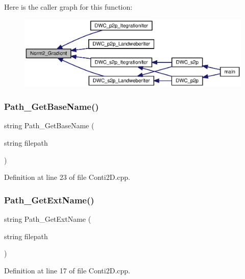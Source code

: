 Here is the caller graph for this function\+:\nopagebreak
\begin{figure}[H]
\begin{center}
\leavevmode
\includegraphics[width=350pt]{Conti2D_8cpp_a43fc3af75243a047d61aadea31c0fa9c_a43fc3af75243a047d61aadea31c0fa9c_icgraph}
\end{center}
\end{figure}
\mbox{\label{Conti2D_8cpp_a3c05f14aad4d9edc8c97ce180341a758_a3c05f14aad4d9edc8c97ce180341a758}} 
\subsubsection{Path\+\_\+\+Get\+Base\+Name()}
{\footnotesize\ttfamily string Path\+\_\+\+Get\+Base\+Name (\begin{DoxyParamCaption}\item[{string}]{filepath }\end{DoxyParamCaption})}



Definition at line 23 of file Conti2\+D.\+cpp.

\mbox{\label{Conti2D_8cpp_aaea96ecea3031c19d3ef88f6f1590d4a_aaea96ecea3031c19d3ef88f6f1590d4a}} 
\subsubsection{Path\+\_\+\+Get\+Ext\+Name()}
{\footnotesize\ttfamily string Path\+\_\+\+Get\+Ext\+Name (\begin{DoxyParamCaption}\item[{string}]{filepath }\end{DoxyParamCaption})}



Definition at line 17 of file Conti2\+D.\+cpp.

